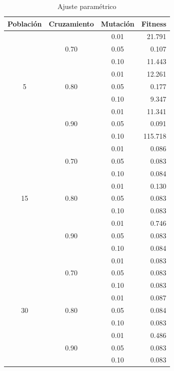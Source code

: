 \documentclass[journal]{IEEEtran}
\begin{document}
\begin{table}[h]
\caption{Ajuste paramétrico}
\centering
\begin{tabular}{|c|c|c||r|}
\hline
Población &Cruzamiento &Mutación &Fitness \\
\hline
\multirow{9}{*}{5}  & \multirow{3}{*}{0.70} & 0.01 &  21.791 \\
                    &                       & 0.05 &   0.107 \\
                    &                       & 0.10 &  11.443 \\\cline{2-4}
                    & \multirow{3}{*}{0.80} & 0.01 &  12.261 \\
                    &                       & 0.05 &   0.177 \\
                    &                       & 0.10 &   9.347 \\\cline{2-4}
                    & \multirow{3}{*}{0.90} & 0.01 &  11.341 \\
                    &                       & 0.05 &   0.091 \\
                    &                       & 0.10 & 115.718 \\\hline
\multirow{9}{*}{15} & \multirow{3}{*}{0.70} & 0.01 &   0.086 \\
                    &                       & 0.05 &   0.083 \\
                    &                       & 0.10 &   0.084 \\\cline{2-4}
                    & \multirow{3}{*}{0.80} & 0.01 &   0.130 \\
                    &                       & 0.05 &   0.083 \\
                    &                       & 0.10 &   0.083 \\\cline{2-4}
                    & \multirow{3}{*}{0.90} & 0.01 &   0.746 \\
                    &                       & 0.05 &   0.083 \\
                    &                       & 0.10 &   0.084 \\\hline
\multirow{9}{*}{30} & \multirow{3}{*}{0.70} & 0.01 &   0.083 \\
                    &                       & 0.05 &   0.083 \\
                    &                       & 0.10 &   0.083 \\\cline{2-4}
                    & \multirow{3}{*}{0.80} & 0.01 &   0.087 \\
                    &                       & 0.05 &   0.084 \\
                    &                       & 0.10 &   0.083 \\\cline{2-4}
                    & \multirow{3}{*}{0.90} & 0.01 &   0.486 \\
                    &                       & 0.05 &   0.083 \\
                    &                       & 0.10 &   0.083 \\\hline
\end{tabular}
\label{tab:tuning}
\end{table}
\end{document}

